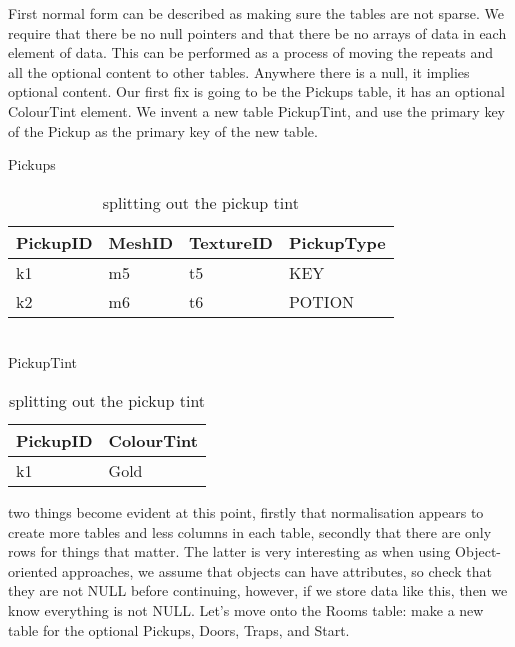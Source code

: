 First normal form can be described as making sure the tables are not sparse. We
require that there be no null pointers and that there be no arrays of data in
each element of data. This can be performed as a process of moving the repeats
and all the optional content to other tables. Anywhere there is a null, it
implies optional content. Our first fix is going to be the Pickups table, it
has an optional ColourTint element. We invent a new table PickupTint, and use
the primary key of the Pickup as the primary key of the new table.

\begin{table}[h]\footnotesize
Pickups\\
\begin{tabular}{llll}
\bf{PickupID}&MeshID&TextureID&PickupType\\
\hline
k1&m5&t5&KEY\\
k2&m6&t6&POTION\\
\end{tabular}\\
PickupTint\\
\begin{tabular}{ll}
\bf{PickupID}&\bf{ColourTint}\\
\hline
k1&Gold\\
\end{tabular}
\caption{splitting out the pickup tint}
\end{table}


two things become evident at this point, firstly that normalisation appears to
create more tables and less columns in each table, secondly that there are only
rows for things that matter. The latter is very interesting as when
using Object-oriented approaches, we assume that objects can have attributes,
so check that they are not NULL before continuing, however, if we store data
like this, then we know everything is not NULL. Let's move onto the Rooms
table: make a new table for the optional Pickups, Doors, Traps, and Start.

